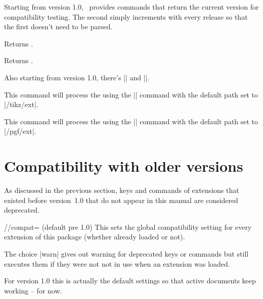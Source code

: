 \begin{multicols}{2}
Starting from version 1.0,
\tikzextname\ provides commands that return the current version for compatibility testing.
The second simply increments with every release
so that the first doesn't need to be parsed.
\begin{command}{\tikzextversion}
  Returns \texttt{\tikzextversion}.
\end{command}
\begin{command}{\tikzextversionnumber}
  Returns \texttt{\tikzextversionnumber}.
\end{command}
%
Also starting from version 1.0, there's |\tikzextset| and |\pgfextset|.
\begin{command}{\tikzextset{}}
  This command will process the  using the
  |\pgfkeys| command with the default path set to |/tikz/ext|.
\end{command}
\begin{command}{\pgfextset{}}
  This command will process the  using the
  |\pgfkeys| command with the default path set to |/pgf/ext|.
\end{command}

\newcolumn
\section{Compatibility with older versions}
As discussed in the previous section,
keys and commands of extensions that existed before version~1.0
that do not appear in this manual are considered deprecated.

\begin{key}{/\tikzext/compat= (default pre 1.0)}
  This sets the global compatibility setting for every extension of this package
  (whether already loaded or not).

  The choice |warn| gives out warning for deprecated keys or commands
  but still executes them if they were not not in use when an extension was loaded.
  
  For version 1.0 this is actually the default settings so that active documents
  keep working -- for now.
  

\end{key}
\end{multicols}
